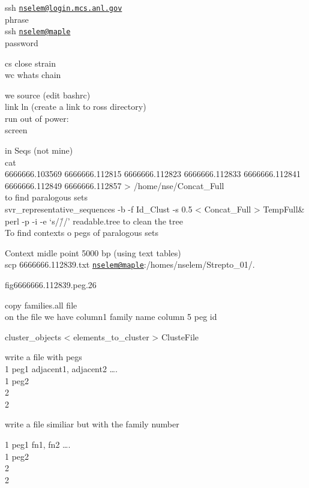 \documentclass[12pt,twoside]{reedthesis}
\begin{document}
  ssh
  \href{mailto:nselem@login.mcs.anl.gov}{\nolinkurl{nselem@login.mcs.anl.gov}}\\
  phrase\\
  ssh \href{mailto:nselem@maple}{\nolinkurl{nselem@maple}}\\
  password
  
  cs close strain\\
  wc whats chain
  
  we source (edit bashrc)\\
  link ln (create a link to ross directory)\\
  run out of power:\\
  screen
  
  in Seqs (not mine)\\
  cat\\
  6666666.103569 6666666.112815 6666666.112823 6666666.112833
  6666666.112841 6666666.112849 6666666.112857 \textgreater{}
  /home/nse/Concat\_Full\\
  to find paralogous sets\\
   svr\_representative\_sequences -b -f Id\_Clust -s 0.5 \textless{}
  Concat\_Full \textgreater{} TempFull\&\\
   perl -p -i -e `s/\r//' readable.tree to clean the tree\\
  To find contexts o pegs of paralogous sets
  
  Context midle point 5000 bp (using text tables)\\
  scp 6666666.112839.txt
  \href{mailto:nselem@maple}{\nolinkurl{nselem@maple}}:/homes/nselem/Strepto\_01/.
  
  fig\textbar{}6666666.112839.peg.26
  
  copy families.all file\\
  on the file we have column1 family name column 5 peg id
  
  cluster\_objects \textless{} elements\_to\_cluster \textgreater{}
  ClusteFile
  
  write a file with pegs\\
  1 peg1 adjacent1, adjacent2 \ldots{}.\\
  1 peg2\\
  2\\
  2
  
  write a file similiar but with the family number
  
  1 peg1 fn1, fn2 \ldots{}.\\
  1 peg2\\
  2\\
  2
  
\end{document}
